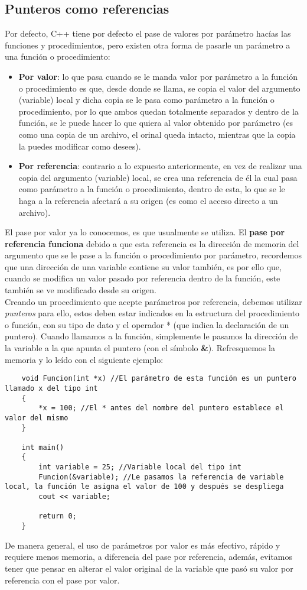 \subsection{Punteros como referencias}
Por defecto, C++ tiene por defecto el pase de valores por parámetro hacías las funciones y procedimientos, pero existen otra forma de pasarle un parámetro a una función o procedimiento:
\begin{itemize}
    \item \textbf{Por valor}: lo que pasa cuando se le manda valor por parámetro a la función o procedimiento es que, desde donde se llama, se copia el valor del argumento (variable) local y dicha copia se le pasa como parámetro a la función o procedimiento, por lo que ambos quedan totalmente separados y dentro de la función, se le puede hacer lo que quiera al valor obtenido por parámetro (es como una copia de un archivo, el orinal queda intacto, mientras que la copia la puedes modificar como desees).
    \item \textbf{Por referencia}: contrario a lo expuesto anteriormente, en vez de realizar una copia del argumento (variable) local, se crea una referencia de él la cual pasa como parámetro a la función o procedimiento, dentro de esta, lo que se le haga a la referencia afectará a su origen (es como el acceso directo a un archivo).
\end{itemize}
El pase por valor ya lo conocemos, es que usualmente se utiliza. El \textbf{pase por referencia funciona} debido a que esta referencia es la dirección de memoria del argumento que se le pase a la función o procedimiento por parámetro, recordemos que una dirección de una variable contiene su valor también, es por ello que, cuando se modifica un valor pasado por referencia dentro de la función, este también se ve modificado desde su origen.\\
Creando un procedimiento que acepte parámetros por referencia, debemos utilizar \textit{punteros} para ello, estos deben estar indicados en la estructura del procedimiento o función, con su tipo de dato y el operador * (que indica la declaración de un puntero). Cuando llamamos a la función, simplemente le pasamos la dirección de la variable a la que apunta el puntero (con el símbolo \textbf{\&}). Refresquemos la memoria y lo leído con el siguiente ejemplo:
\begin{lstlisting}
    void Funcion(int *x) //El parámetro de esta función es un puntero llamado x del tipo int
    {
        *x = 100; //El * antes del nombre del puntero establece el valor del mismo
    }
    
    int main()
    {
        int variable = 25; //Variable local del tipo int
        Funcion(&variable); //Le pasamos la referencia de variable local, la función le asigna el valor de 100 y después se despliega
        cout << variable;
    
        return 0;
    }
\end{lstlisting}
De manera general, el uso de parámetros por valor es más efectivo, rápido y requiere menos memoria, a diferencia del pase por referencia, además, evitamos tener que pensar en alterar el valor original de la variable que pasó su valor por referencia con el pase por valor.

